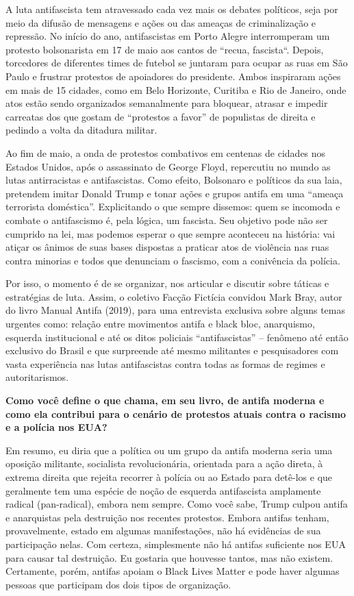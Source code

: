\bigskip

A luta antifascista tem atravessado cada vez mais os debates políticos, seja por meio da difusão de mensagens e ações ou das ameaças de criminalização e repressão. No início do ano, antifascistas em Porto Alegre interromperam um protesto bolsonarista em 17 de maio aos cantos de “recua, fascista“. Depois, torcedores de diferentes times de futebol se juntaram para ocupar as ruas em São Paulo e frustrar protestos de apoiadores do presidente. Ambos inspiraram ações em mais de 15 cidades, como em Belo Horizonte, Curitiba e Rio de Janeiro, onde atos estão sendo organizados semanalmente para bloquear, atrasar e impedir carreatas dos que gostam de “protestos a favor” de populistas de direita e pedindo a volta da ditadura militar.
 
Ao fim de maio, a onda de protestos combativos em centenas de cidades nos Estados Unidos, após o assassinato de George Floyd, repercutiu no mundo as lutas antirracistas e antifascistas. Como efeito, Bolsonaro e políticos da sua laia, pretendem imitar Donald Trump e tonar ações e grupos antifa em uma “ameaça terrorista doméstica”. Explicitando o que sempre dissemos: quem se incomoda e combate o antifascismo é, pela lógica, um fascista. Seu objetivo pode não ser cumprido na lei, mas podemos esperar o que sempre aconteceu na história: vai atiçar os ânimos de suas bases dispostas a praticar atos de violência nas ruas contra minorias e todos que denunciam o fascismo, com a conivência da polícia.
 
Por isso, o momento é de se organizar, nos articular e discutir sobre táticas e estratégias de luta. Assim, o coletivo Facção Fictícia convidou Mark Bray, autor do livro Manual Antifa (2019), para uma entrevista exclusiva sobre alguns temas urgentes como: relação entre movimentos antifa e black bloc, anarquismo, esquerda institucional e até os ditos policiais “antifascistas” – fenômeno até então exclusivo do Brasil e que surpreende até mesmo militantes e pesquisadores com vasta experiência nas lutas antifascistas contra todas as formas de regimes e autoritarismos.


\textbf{Como você define o que chama, em seu livro, de antifa moderna e como ela contribui para o cenário de protestos atuais contra o racismo e a polícia nos EUA?}

Em resumo, eu diria que a política ou um grupo da antifa moderna seria uma oposição militante, socialista revolucionária, orientada para a ação direta, à extrema direita que rejeita recorrer à polícia ou ao Estado para detê-los e que geralmente tem uma espécie de noção de esquerda antifascista amplamente radical (pan-radical), embora nem sempre. Como você sabe, Trump culpou antifa e anarquistas pela destruição nos recentes protestos. Embora antifas tenham, provavelmente, estado em algumas manifestações, não há evidências de sua participação nelas. Com certeza, simplesmente não há antifas suficiente nos EUA para causar tal destruição. Eu gostaria que houvesse tantos, mas não existem. Certamente, porém, antifas apoiam o Black Lives Matter e pode haver algumas pessoas que participam dos dois tipos de organização. 
 

